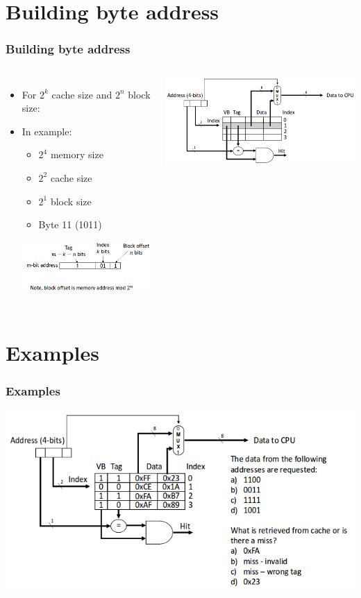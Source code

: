 \documentclass{beamer}
\begin{document}
\section{Building byte address}
\begin{frame}
\frametitle{Building byte address}
\begin{columns}[c]
\begin{itemize}
\item For $2^k$ cache size and $2^n$ block size:
\item In example:
\begin{itemize}
\item $2^4$ memory size
\item $2^2$ cache size
\item $2^1$ block size
\item Byte 11 (1011)
\end{itemize}
\includegraphics[scale=0.3]{byteex.png}
\end{itemize}
\includegraphics[scale=0.34]{byteex2.png}
\end{columns}
\end{frame}
\section{Examples}
\begin{frame}
\frametitle{Examples}
\includegraphics[scale=0.5]{exer.png}
\end{frame}
\end{document}
